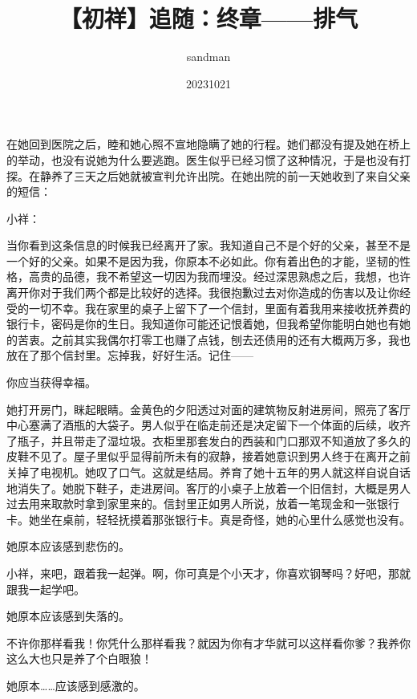 \documentclass{article}
\title{【初祥】追随：终章——排气}
\author{sandman}
\date{20231021}
\begin{document}



\Large

在她回到医院之后，睦和她心照不宣地隐瞒了她的行程。她们都没有提及她在桥上的举动，也没有说她为什么要逃跑。医生似乎已经习惯了这种情况，于是也没有打探。在静养了三天之后她就被宣判允许出院。在她出院的前一天她收到了来自父亲的短信：



小祥：



当你看到这条信息的时候我已经离开了家。我知道自己不是个好的父亲，甚至不是一个好的父亲。如果不是因为我，你原本不必如此。你有着出色的才能，坚韧的性格，高贵的品德，我不希望这一切因为我而埋没。经过深思熟虑之后，我想，也许离开你对于我们两个都是比较好的选择。我很抱歉过去对你造成的伤害以及让你经受的一切不幸。我在家里的桌子上留下了一个信封，里面有着我用来接收抚养费的银行卡，密码是你的生日。我知道你可能还记恨着她，但我希望你能明白她也有她的苦衷。之前其实我偶尔打零工也赚了点钱，刨去还债用的还有大概两万多，我也放在了那个信封里。忘掉我，好好生活。记住——



你应当获得幸福。



她打开房门，眯起眼睛。金黄色的夕阳透过对面的建筑物反射进房间，照亮了客厅中心塞满了酒瓶的大袋子。男人似乎在临走前还是决定留下一个体面的后续，收齐了瓶子，并且带走了湿垃圾。衣柜里那套发白的西装和门口那双不知道放了多久的皮鞋不见了。屋子里似乎显得前所未有的寂静，接着她意识到男人终于在离开之前关掉了电视机。她叹了口气。这就是结局。养育了她十五年的男人就这样自说自话地消失了。她脱下鞋子，走进房间。客厅的小桌子上放着一个旧信封，大概是男人过去用来取款时拿到家里来的。信封里正如男人所说，放着一笔现金和一张银行卡。她坐在桌前，轻轻抚摸着那张银行卡。真是奇怪，她的心里什么感觉也没有。



她原本应该感到悲伤的。



小祥，来吧，跟着我一起弹。啊，你可真是个小天才，你喜欢钢琴吗？好吧，那就跟我一起学吧。



她原本应该感到失落的。



不许你那样看我！你凭什么那样看我？就因为你有才华就可以这样看你爹？我养你这么大也只是养了个白眼狼！



她原本……应该感到感激的。
\end{document}
